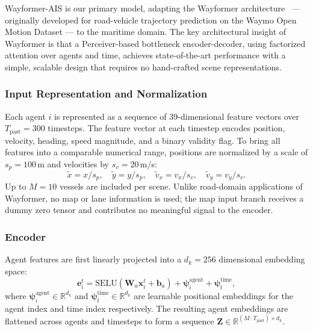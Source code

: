 \documentclass[12pt, a4paper]{article}
\begin{document}
Wayformer-AIS is our primary model, adapting the Wayformer
architecture~\citep{nayakanti2022wayformer} — originally developed for
road-vehicle trajectory prediction on the Waymo Open Motion Dataset —
to the maritime domain. The key architectural insight of Wayformer is
that a Perceiver-based bottleneck encoder-decoder, using factorized
attention over agents and time, achieves state-of-the-art performance
with a simple, scalable design that requires no hand-crafted
scene representations.

\subsubsection{Input Representation and Normalization}
\label{sec:normalization}

Each agent $i$ is represented as a sequence of 39-dimensional feature
vectors over $T_{\text{past}} = 300$ timesteps. The feature vector at
each timestep encodes position, velocity, heading, speed magnitude,
and a binary validity flag. To bring all features into a comparable
numerical range, positions are normalized by a scale of
$s_p = 100$\,m and velocities by $s_v = 20$\,m/s:
\begin{equation}
    \tilde{x} = x / s_p, \quad
    \tilde{y} = y / s_p, \quad
    \tilde{v}_x = v_x / s_v, \quad
    \tilde{v}_y = v_y / s_v.
    \label{eq:normalization}
\end{equation}
Up to $M = 10$ vessels are included per scene. Unlike road-domain
applications of Wayformer, no map or lane information is used; the
map input branch receives a dummy zero tensor and contributes no
meaningful signal to the encoder.

\subsubsection{Encoder}
\label{sec:encoder}

Agent features are first linearly projected into a $d_k = 256$
dimensional embedding space:
\begin{equation}
    \mathbf{e}_i^t = \text{SELU}\!\left(\mathbf{W}_a \mathbf{x}_i^t + \mathbf{b}_a\right)
    + \boldsymbol{\psi}_i^{\text{agent}}
    + \boldsymbol{\psi}_t^{\text{time}},
    \label{eq:agent_emb}
\end{equation}
where $\boldsymbol{\psi}_i^{\text{agent}} \in \mathbb{R}^{d_k}$ and
$\boldsymbol{\psi}_t^{\text{time}} \in \mathbb{R}^{d_k}$ are learnable
positional embeddings for the agent index and time index respectively.
The resulting agent embeddings are flattened across agents and timesteps
to form a sequence $\mathbf{Z} \in \mathbb{R}^{(M \cdot T_{\text{past}}) \times d_k}$.
\end{document}
